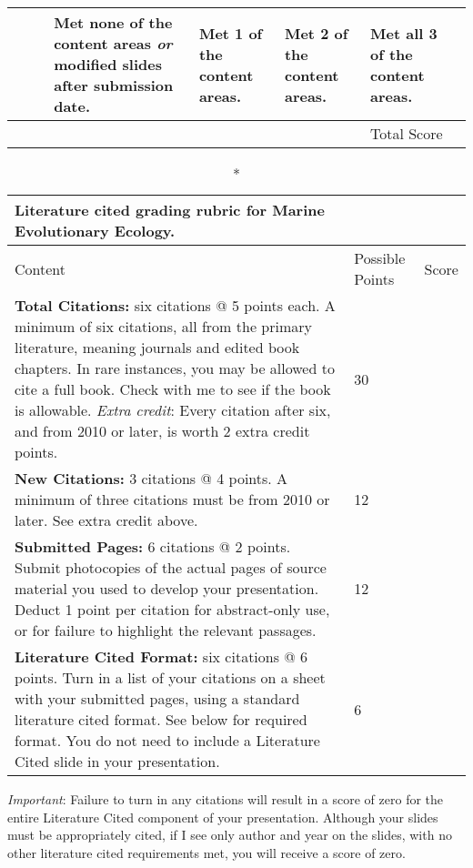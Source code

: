 \documentclass[10pt]{article}
\newcommand{\VSpace}{\vspace{\baselineskip}}
\begin{document}
\begin{landscape}
{\begin{longtable}[l]{@{}L{5cm}L{3.5cm}L{3.5cm}L{3.5cm}L{3.5cm}L{1.9cm}@{}}
\begin{enumerate}[itemsep=-0.25\baselineskip,align=left, leftmargin=*]
\end{enumerate}&%
Met none of the content areas \emph{or} modified slides after submission date. &%
Met 1 of the content areas. &%
Met 2 of the content areas. &%
Met all 3 of the content areas. &%
\\[-1em]
\midrule
& & & & \vspace{0.5in}\par\hfill\normalsize{Total Score\phantom{m}} & \\
\bottomrule
\end{longtable}
}%

\end{landscape}
\newpage
{}
{\small
\begin{longtable}[l]{@{}L{11cm}C{3cm}L{1cm}@{}}
\caption*{\textbf{Literature cited grading rubric for Marine Evolutionary Ecology.}}\\
\toprule
Content	&	Possible Points	&	Score \\
\midrule
\textbf{Total Citations:} six citations @ 5 points each. A minimum of six citations, all from the primary literature, meaning journals and edited book chapters. In rare instances, you may be allowed to cite a full book. Check with me to see if the book is allowable. \emph{Extra credit}: Every citation after six, and from 2010 or later, is worth 2 extra credit points. &
30 & \\
\midrule
\textbf{New Citations:} 3 citations @ 4 points. A minimum of three citations must be from 2010 or later. See extra credit above. &
12 & \\
\midrule
\textbf{Submitted Pages:}  6 citations @ 2 points. Submit photocopies of the actual pages of source material you used to develop your presentation. Deduct 1 point per citation for abstract-only use, or for failure to highlight the relevant passages.  &
12 & \\
\midrule
\textbf{Literature Cited Format:} six citations @ 6 points. Turn in a list of your citations on a sheet with your submitted pages, using a standard literature cited format.  See below for required format. You do not need to include a Literature Cited slide in your presentation. &
6 & \\
\bottomrule
\end{longtable}
}%

\emph{Important}: Failure to turn in any citations will result in a score of zero for the entire Literature Cited component of your presentation.  Although your slides must be appropriately cited, if I see only author and year on the slides, with no other literature cited requirements met, you will receive a score of zero.\VSpace
\end{document}
